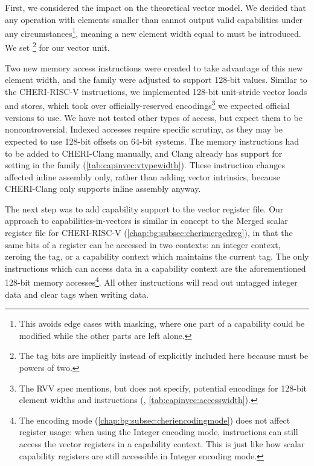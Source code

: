 \documentclass[../thesis]{subfiles}
\begin{document}
First, we considered the impact on the theoretical vector model.
We decided that any operation with elements smaller than  cannot output valid capabilities under any circumstances\footnote{This avoids edge cases with masking, where one part of a capability could be modified while the other parts are left alone.}, meaning a new element width equal to  must be introduced.
We set \footnote{The tag bits are implicitly instead of explicitly included here because  must be powers of two.} for our vector unit.

Two new memory access instructions were created to take advantage of this new element width, and the  family were adjusted to support 128-bit values.
Similar to the CHERI-RISC-V  instructions, we implemented 128-bit unit-stride vector loads and stores, which took over officially-reserved encodings\footnote{The RVV spec mentions, but does not specify, potential encodings for 128-bit element widths and instructions (\cite[p10, p32]{specification-RVV-v1.0}, \cref{tab:capinvec:accesswidth}).} we expected official versions to use.
We have not tested other types of access, but expect them to be noncontroversial.
Indexed accesses require specific scrutiny, as they may be expected to use 128-bit offsets on 64-bit systems.
The memory instructions had to be added to CHERI-Clang manually, and Clang already has support for setting  in the  family (\cref{tab:capinvec:vtypewidth}).
These instruction changes affected inline assembly only, rather than adding vector intrinsics, because CHERI-Clang only supports inline assembly anyway.

% 

The next step was to add capability support to the vector register file.
Our approach to capabilities-in-vectors is similar in concept to the Merged scalar register file for CHERI-RISC-V (\cref{chap:bg:subsec:cherimergedreg}), in that the same bits of a register can be accessed in two contexts: an integer context, zeroing the tag, or a capability context which maintains the current tag.
The only instructions which can access data in a capability context are the aforementioned 128-bit memory accesses\footnote{The encoding mode (\cref{chap:bg:subsec:cheriencodingmode}) does not affect register usage: when using the Integer encoding mode, instructions can still access the vector registers in a capability context. This is just like how scalar capability registers are still accessible in Integer encoding mode.}.
All other instructions will read out untagged integer data and clear tags when writing data.
\end{document}
